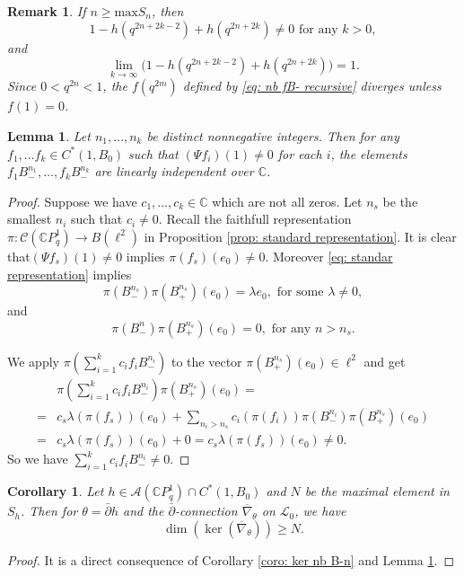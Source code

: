 \documentclass[12pt]{article}
\newtheorem{remark}[definition]{Remark}
\newtheorem{lemma}[definition]{Lemma}
\newtheorem{corollary}[definition]{Corollary}
\numberwithin{equation}{section}
\def\max{{\mathrm {max}}}
\def\pb{\bar{\partial}}
\def\nb{\bar{\nabla}_\theta}
\def\nb{\overline{\nabla}_\theta}
\def\C{{\mathbb C}}
\def\A{\mathcal{A}}
\def\L{\mathcal{L}}
\begin{document}
\begin{remark}
    If $n\geq \max{S_n}$, then 
    $$1 - h(q^{2n + 2k-2}) + h(q^{2n+2k })\neq 0 \text{ for any } k>0,$$  and 
    $$\lim_{k\to \infty}\big(1 - h(q^{2n + 2k-2}) + h(q^{2n+2k })\big)=1.$$
    Since $0<q^{2n}<1$, the $f(q^{2m})$ defined by \eqref{eq: nb fB- recursive} diverges unless $f(1)=0$.
\end{remark}

\begin{lemma}\label{lemma: fB- linearly independent}
Let $n_1,\ldots, n_k$ be distinct nonnegative integers. Then for any $f_1,\ldots f_k\in C^*(1,B_0)$ such that $(\Psi f_i)(1)\neq 0$ for each $i$, the elements $f_1B_-^{n_1},\ldots, f_kB_-^{n_k}$ are linearly independent over $\C$.
\end{lemma}
\begin{proof}
    Suppose we have $c_1,\ldots, c_k\in \C$ which are not all zeros.
    Let $n_s$ be the smallest $n_i$ such that $c_i\neq 0$. Recall the faithfull representation $\pi: \mathcal{C}(\C P^1_q)\to B(\ell^2)$ in Proposition \ref{prop: standard representation}. It is clear that$(\Psi f_s)(1)\neq 0$ implies
    $\pi(f_s)(e_0)\neq 0$. Moreover \eqref{eq: standar representation} implies
    \begin{equation}
        \pi(B_-^{n_s})\pi(B_+^{n_s})(e_0)=\lambda e_0, \text{ for some }\lambda\neq 0,
    \end{equation}
    and
    \begin{equation}
          \pi(B_-^{n})\pi(B_+^{n_s})(e_0)=0, \text{ for any }n> n_s.
    \end{equation}

    We apply $\pi(\sum_{i=1}^kc_if_iB_-^{n_i})$ to the vector $\pi(B_+^{n_s})(e_0)\in \ell^2$ and get
    \begin{equation}
    \begin{split}
    &\pi(\sum_{i=1}^kc_if_iB_-^{n_i})\pi(B_+^{n_s})(e_0)=\\
    =& c_s\lambda (\pi (f_s))(e_0)+\sum_{n_i>n_s}c_i(\pi (f_i)) \pi(B_-^{n_i})\pi(B_+^{n_s})(e_0)\\
    =& c_s \lambda (\pi (f_s))(e_0)+0=c_s \lambda (\pi (f_s))(e_0)\neq 0.
    \end{split}
    \end{equation}
    So we have $\sum_{i=1}^kc_if_iB_-^{n_i}\neq 0$.
\end{proof}




\begin{corollary} \label{coro: ker_dim_lower_bound}
    Let $h\in  \A(\C P^1_q)\cap C^*(1, B_0)$ and $N$ be the maximal element in $S_h$. Then for  $\theta = \pb h$ and the $\pb$-connection $\nb$ on $\L_0$, we have 
    \begin{equation}
    \dim(\ker(\nb)) \geq N.\end{equation}
\end{corollary}
\begin{proof}
    It is a direct consequence of Corollary \ref{coro: ker nb B-n} and Lemma \ref{lemma: fB- linearly independent}.
\end{proof}
\end{document}
